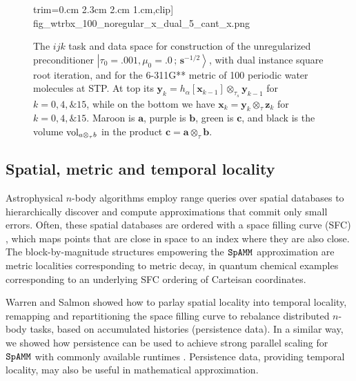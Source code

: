 \documentclass[letterpaper,twocolumn,amsmath,amsfont,amssymb,english,aps,jcp,preprintnumbers,groupaddress,nofootinbib,tightenlines,floatfix]{revtex4}
\newcommand{\mat}[1]{\boldsymbol{#1}}
\newcommand{\ot}{  {\scriptstyle \otimes}_{ \tau } }
\newcommand{\ots}{ {\scriptstyle \otimes}_{ \! \tau_s } }
\theoremstyle{plain}
\theoremstyle{remark}
\theoremstyle{plain}
\begin{document}
\begin{figure}[h]
{                        trim={0.cm 2.3cm 2.cm 1.cm},clip]
                        {fig_wtrbx_100_noregular_x_dual_5_cant_x.png}} 
\caption{
The $ijk$ task and data space for construction of the unregularized preconditioner 
$\left|\tau_0=.001,\mu_0=.0\, ; \,\scriptstyle{\mat{s}^{-1/2}} \right>$, with
dual instance square root iteration, and for the 6-311G** metric of 100 periodic water molecules
at STP.  At top its  $\mat{y}_k=h_\alpha[ \mat{x}_{k-1} ] \ots \mat{y}_{k-1}$
for $k=0,4,\& 15$, while on the bottom we have $\mat{x}_k=  \mat{y}_{k}  \ot \mat{z}_{k}$ for $k=0,4, \& 15$.
Maroon is $\mat{a}$, purple is $\mat{b}$, green is $\mat{c}$,  and black is the volume ${\rm vol}_{a \ot b}$
in the product $\mat{c}=\mat{a} \ot \mat{b}$.}\label{Lensing3}
\end{figure}

\subsection{Spatial, metric  and temporal locality}

Astrophysical $n$-body algorithms employ range queries over spatial databases to hierarchically discover 
and compute approximations that commit only small errors.  Often, these spatial databases are ordered with a 
space filling curve (SFC) 
\cite{Wise:1984:RMQ:1089389.1089398,springerlink:10.1007/3-540-51084-2_9,
      Samet:1990:DAS:77589,Wise1990,Wise:Ahnentafel,
      Lorton:2006:ABL:1166133.1166134,Samet:2006:DBDS,Adams:2006:SOS,Bock2013,bader13}, 
which maps points that are close in space to an index where they are also close. 
The block-by-magnitude structures empowering the $\tt SpAMM$ approximation are metric localities corresponding
to metric decay, in quantum chemical examples corresponding to an underlying SFC ordering of Carteisan coordinates. 

Warren and Salmon showed how to parlay spatial locality into temporal locality, 
remapping and repartitioning the space filling curve to rebalance distributed $n$-body tasks,
based on accumulated histories (persistence data).
In a similar way, we showed how persistence can be used to achieve 
strong parallel scaling for $\tt SpAMM$ with commonly available runtimes \cite{BockCK14}.  
Persistence data, providing temporal locality, may also be useful in mathematical approximation.  
\end{document}
